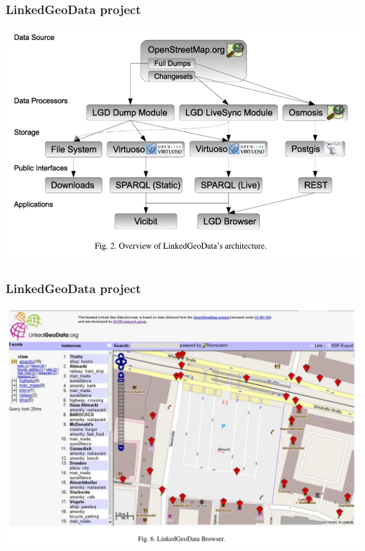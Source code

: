 \documentclass[10pt]{beamer}
\begin{document}
\begin{frame}
  \frametitle{LinkedGeoData project}
  \centering
  \includegraphics[width=\linewidth]{lgd-sys.png}
\end{frame}

\begin{frame}
  \frametitle{LinkedGeoData project}
  \centering
  \includegraphics[width=\linewidth]{lgd-screen.png}
\end{frame}
\end{document}
